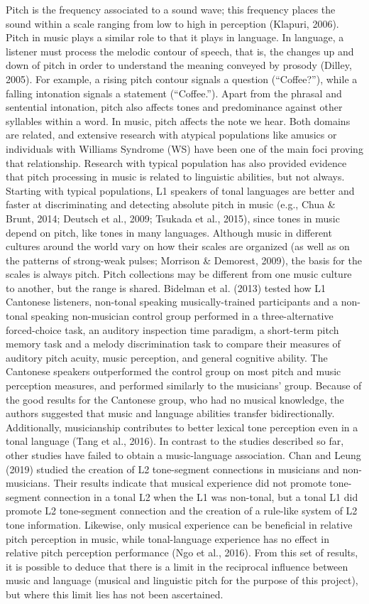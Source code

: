\documentclass[english,man]{apa6}
\begin{document}
Pitch is the frequency associated to a sound wave; this frequency places the sound within a scale ranging from low to high in perception (Klapuri, 2006). Pitch in music plays a similar role to that it plays in language. In language, a listener must process the melodic contour of speech, that is, the changes up and down of pitch in order to understand the meaning conveyed by prosody (Dilley, 2005). For example, a rising pitch contour signals a question (\enquote{Coffee?}), while a falling intonation signals a statement (\enquote{Coffee.}). Apart from the phrasal and sentential intonation, pitch also affects tones and predominance against other syllables within a word. In music, pitch affects the note we hear. Both domains are related, and extensive research with atypical populations like amusics or individuals with Williams Syndrome (WS) have been one of the main foci proving that relationship. Research with typical population has also provided evidence that pitch processing in music is related to linguistic abilities, but not always.
Starting with typical populations, L1 speakers of tonal languages are better and faster at discriminating and detecting absolute pitch in music (e.g., Chua \& Brunt, 2014; Deutsch et al., 2009; Tsukada et al., 2015), since tones in music depend on pitch, like tones in many languages. Although music in different cultures around the world vary on how their scales are organized (as well as on the patterns of strong-weak pulses; Morrison \& Demorest, 2009), the basis for the scales is always pitch. Pitch collections may be different from one music culture to another, but the range is shared. Bidelman et al. (2013) tested how L1 Cantonese listeners, non-tonal speaking musically-trained participants and a non-tonal speaking non-musician control group performed in a three-alternative forced-choice task, an auditory inspection time paradigm, a short-term pitch memory task and a melody discrimination task to compare their measures of auditory pitch acuity, music perception, and general cognitive ability. The Cantonese speakers outperformed the control group on most pitch and music perception measures, and performed similarly to the musicians' group. Because of the good results for the Cantonese group, who had no musical knowledge, the authors suggested that music and language abilities transfer bidirectionally. Additionally, musicianship contributes to better lexical tone perception even in a tonal language (Tang et al., 2016).
In contrast to the studies described so far, other studies have failed to obtain a music-language association. Chan and Leung (2019) studied the creation of L2 tone-segment connections in musicians and non-musicians. Their results indicate that musical experience did not promote tone-segment connection in a tonal L2 when the L1 was non-tonal, but a tonal L1 did promote L2 tone-segment connection and the creation of a rule-like system of L2 tone information. Likewise, only musical experience can be beneficial in relative pitch perception in music, while tonal-language experience has no effect in relative pitch perception performance (Ngo et al., 2016). From this set of results, it is possible to deduce that there is a limit in the reciprocal influence between music and language (musical and linguistic pitch for the purpose of this project), but where this limit lies has not been ascertained.
\end{document}
